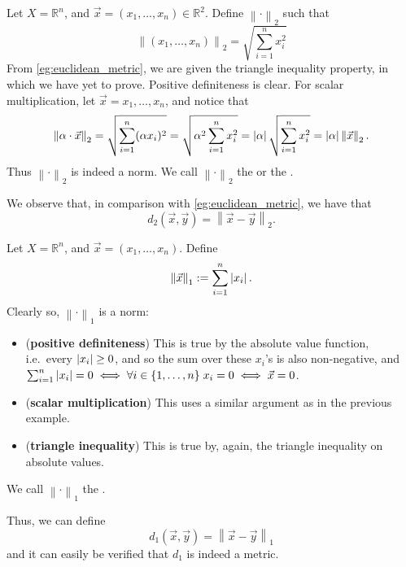 \documentclass[notoc,notitlepage]{tufte-book}
\newcommand{\norm}[1]{\left\| #1 \right\|}
\begin{document}
\begin{eg}\label{eg:euclidean_norm}
  Let $X = \mathbb{R}^n$, and $\vec{x} = ( x_1, \ldots, x_n ) \in \mathbb{R}^2$. Define $\norm{\cdot}_2$ such that
  \begin{equation*}
    \norm{(x_1, \ldots, x_n)}_2 = \sqrt{ \sum_{i=1}^{n} x_i^2 }
  \end{equation*}
  From \cref{eg:euclidean_metric}, we are given the triangle inequality property, in which we have yet to prove. Positive definiteness is clear. For scalar multiplication, let $\vec{x} = { x_1, \ldots, x_n }$, and notice that
  \begin{equation*}
    \norm{\alpha \cdot \vec{x}}_2 = \sqrt{ \sum_{i=1}^{n} (\alpha x_i)^2 } = \sqrt{ \alpha^2 \sum_{i=1}^{n} x_i^2 } = \abs{\alpha} \sqrt{ \sum_{i=1}^{n} x_i^2 } = \abs{\alpha} \norm{\vec{x}}_2.
  \end{equation*}
  Thus $\norm{\cdot}_2$ is indeed a norm. We call $\norm\cdot_2$ the  or the .

  We observe that, in comparison with \cref{eg:euclidean_metric}, we have that
  \begin{equation*}
    d_2(\vec{x}, \vec{y}) = \norm{\vec{x} - \vec{y}}_2.
  \end{equation*}
\end{eg}

\begin{eg}[1-norm]\label{eg:1_norm}
  Let $X = \mathbb{R}^n$, and $\vec{x} = ( x_1, \ldots, x_n )$. Define
  \begin{equation*}
    \norm{\vec{x}}_1 := \sum_{i = 1}^{n} \abs{x_i}.
  \end{equation*}
  Clearly so, $\norm\cdot_1$ is a norm:
  \begin{itemize}
    \item (\textbf{positive definiteness}) This is true by the absolute value function, i.e.\ every $\left|x_i\right| \geq 0$, and so the sum over these $x_i$'s is also non-negative, and $\sum_{i=1}^{n} \left|x_i\right| = 0 \iff \forall i \in \{ 1, \ldots, n\} \; x_i = 0 \iff \vec{x} = 0$.
    \item (\textbf{scalar multiplication}) This uses a similar argument as in the previous example.
    \item (\textbf{triangle inequality}) This is true by, again, the triangle inequality on absolute values.
  \end{itemize}
  We call $\norm\cdot_1$ the .

  Thus, we can define
  \begin{equation*}
    d_1(\vec{x}, \vec{y}) = \norm{\vec{x} - \vec{y}}_1
  \end{equation*}
  and it can easily be verified that $d_1$ is indeed a metric.
\end{eg}
\end{document}
